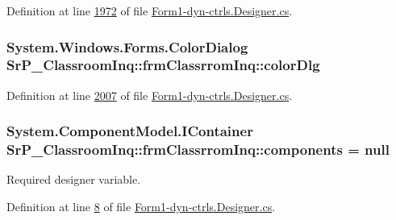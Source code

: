 \-Definition at line \hyperlink{_form1-dyn-ctrls_8_designer_8cs_source_l01972}{1972} of file \hyperlink{_form1-dyn-ctrls_8_designer_8cs_source}{\-Form1-\/dyn-\/ctrls.\-Designer.\-cs}.

\hypertarget{class_sr_p___classroom_inq_1_1frm_classrrom_inq_afb408ee0fe102fbf3df36e551ec24d4c}{
\subsubsection[{color\-Dlg}]{\setlength{\rightskip}{0pt plus 5cm}\-System.\-Windows.\-Forms.\-Color\-Dialog {\bf \-Sr\-P\-\_\-\-Classroom\-Inq\-::frm\-Classrrom\-Inq\-::color\-Dlg}}}
\label{class_sr_p___classroom_inq_1_1frm_classrrom_inq_afb408ee0fe102fbf3df36e551ec24d4c}


\-Definition at line \hyperlink{_form1-dyn-ctrls_8_designer_8cs_source_l02007}{2007} of file \hyperlink{_form1-dyn-ctrls_8_designer_8cs_source}{\-Form1-\/dyn-\/ctrls.\-Designer.\-cs}.

\hypertarget{class_sr_p___classroom_inq_1_1frm_classrrom_inq_a9ae295b3d0621cd5e50bcf8a475c0686}{
\subsubsection[{components}]{\setlength{\rightskip}{0pt plus 5cm}\-System.\-Component\-Model.\-I\-Container {\bf \-Sr\-P\-\_\-\-Classroom\-Inq\-::frm\-Classrrom\-Inq\-::components} = null}}
\label{class_sr_p___classroom_inq_1_1frm_classrrom_inq_a9ae295b3d0621cd5e50bcf8a475c0686}


\-Required designer variable. 



\-Definition at line \hyperlink{_form1-dyn-ctrls_8_designer_8cs_source_l00008}{8} of file \hyperlink{_form1-dyn-ctrls_8_designer_8cs_source}{\-Form1-\/dyn-\/ctrls.\-Designer.\-cs}.

